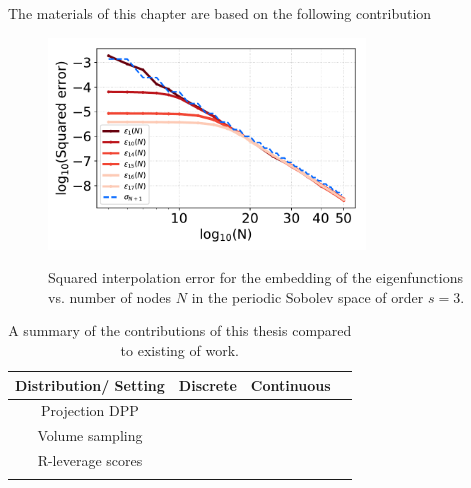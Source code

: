 \documentclass[twoside,11pt]{book}
\numberwithin{theorem}{chapter}
\numberwithin{definition}{chapter}
\numberwithin{proposition}{chapter}
\numberwithin{corollary}{chapter}
\numberwithin{example}{chapter}
\numberwithin{lemma}{chapter}
\numberwithin{assumption}{chapter}
\DeclareMathOperator{\X}{\mathcal{X}}
\begin{document}
The materials of this chapter
are based on the following contribution








\begin{figure}
\centering
\includegraphics[width=0.75\textwidth]{img/neurips/Sobolev/multig_interpolation_pSobolev_s_3_fig_1.pdf}\\
\caption{Squared interpolation error for the embedding of the eigenfunctions vs. number of nodes $N$ in the periodic Sobolev space of order $s=3$.
\label{fig:introduction_pDPP_results_pSobolev_exp_2}}
\end{figure}




\begin{table}
\centering
 \begin{tabular}{| c| c| c| c|}
 \hline
  Distribution/ Setting & Discrete & Continuous\\
 \hline
 Projection DPP& \cite{BeBaCh18} & \cite{BeBaCh19} \\
 \hline
 Volume sampling& \cite{DRVW06} & \cite{BeBaCh20} \\
 \hline
 R-leverage scores & \cite{Bac13}  & \cite{Bac17}  \\
 &  \cite{AlMa15} &   \\
\hline
\end{tabular}
\caption{A summary of the contributions of this thesis compared to existing of work.\label{table:matrix_operator_duality}}
\end{table}
\end{document}
